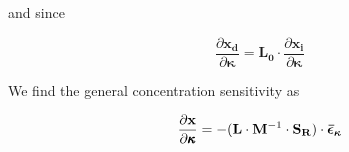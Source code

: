 \documentclass{article}
\begin{document}
	and since 
	
	\begin{center}
		\begin{equation}
			\frac{\partial \mathbf{x_d}}{\partial \pmb{\kappa}}= \mathbf{L_0} \cdot \frac{\partial \mathbf{x_i}}{\partial \pmb{\kappa}}
			\label{38}
		\end{equation}
	\end{center}
	
	We find the general concentration sensitivity as 
	
	\begin{center}
		\begin{equation}
			\frac{\partial \mathbf{x}}{\partial \pmb{\kappa}}
			= -(\mathbf{L} \cdot \mathbf{M}^{-1} \cdot \mathbf{S_R}) \cdot \bm{\Bar{\epsilon}_{\kappa}}
			\label{39}
		\end{equation}
	\end{center}
	
\end{document}
